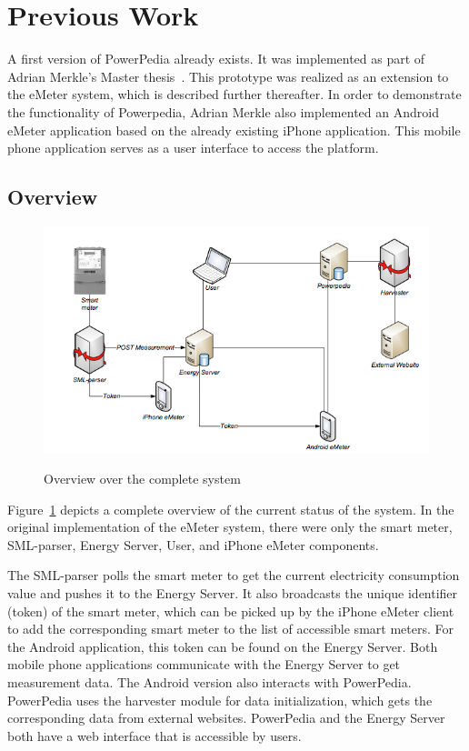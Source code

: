 \section{Previous Work} \label{sec:previous_work}
A first version of PowerPedia already exists. It was implemented as part of Adrian Merkle's Master thesis~\cite{merklepp}. This prototype was realized as an extension to the eMeter system, which is described further thereafter.
In order to demonstrate the functionality of Powerpedia, Adrian Merkle also implemented an Android eMeter application based on the already existing iPhone application. This mobile phone application serves as a user interface to access the platform.

\subsection{Overview}
\begin{center}
\begin{figure}
 \includegraphics[width=15cm]{Images/emeter_overview.png}
 \label{emeter_overview}
 \caption{Overview over the complete system}
\end{figure}
\end{center}
Figure~\ref{emeter_overview} depicts a complete overview of the current status of the system. In the original implementation of the eMeter system, there were only the smart meter, SML-parser, Energy Server, User, and iPhone eMeter components.

The SML-parser polls the smart meter to get the current electricity consumption value and pushes it to the Energy Server. It also broadcasts the unique identifier (token) of the smart meter, which can be picked up by the iPhone eMeter client to add the corresponding smart meter to the list of accessible smart meters. For the Android application, this token can be found on the Energy Server. Both mobile phone applications communicate with the Energy Server to get measurement data. The Android version also interacts with PowerPedia. PowerPedia uses the harvester module for data initialization, which gets the corresponding data from external websites. 
PowerPedia and the Energy Server both have a web interface that is accessible by users.  

